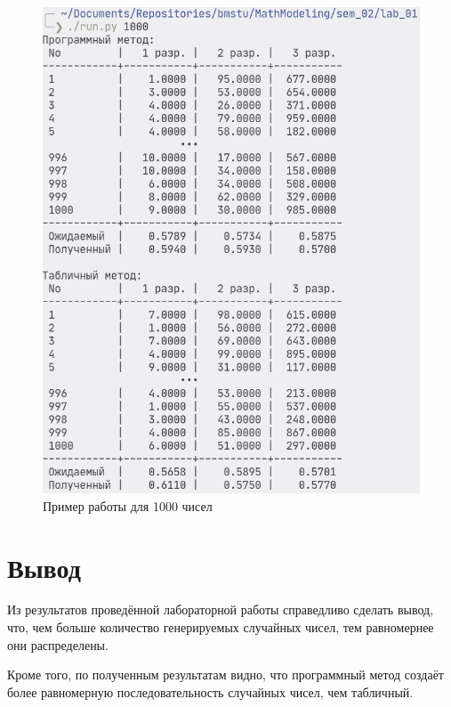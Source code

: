\begin{figure}[htpb]
    \centering
    \includegraphics[width=0.8\linewidth]{images/scr03.png}
    \caption{Пример работы для 1000 чисел}%
    \label{fig:scr01}
\end{figure}

\chapter{Вывод}%
\label{cha:vyvod}

Из результатов проведённой лабораторной работы справедливо сделать вывод, что, чем больше количество генерируемых случайных чисел, тем равномернее они распределены.

Кроме того, по полученным результатам видно, что программный метод создаёт более равномерную последовательность случайных чисел, чем табличный.

